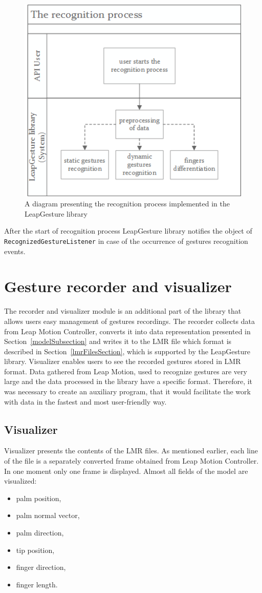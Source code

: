\begin{figure}[htb]
\centering
 \includegraphics[width=0.6\columnwidth]{figures/recognitionProcess.png}
 \caption{A diagram presenting the recognition process implemented in the LeapGesture library}
 \label{recognitionprocess}
\end{figure}

After the start of recognition process LeapGesture library notifies the object of \linebreak \texttt{RecognizedGestureListener} in case of the occurrence of gestures recognition events.

\section{Gesture recorder and visualizer}\label{recordvisualSection}
The recorder and visualizer module is an additional part of the library that allows users easy management of gestures recordings. The recorder collects data from Leap Motion Controller, converts it into data representation presented in Section~\ref{modelSubsection} and writes it to the LMR file which format is described in Section~\ref{lmrFilesSection}, which is supported by the LeapGesture library. Visualizer enables users to see the recorded gestures stored in LMR format. Data gathered from Leap Motion, used to recognize gestures are very large and the data processed in the library have a specific format. Therefore, it was necessary to create an auxiliary program, that it would facilitate the work with data in the fastest and most user-friendly way.

\subsection{Visualizer}
Visualizer presents the contents of the LMR files. As mentioned earlier, each line of the file is a separately converted frame obtained from Leap Motion Controller. In one moment only one frame is displayed.
Almost all fields of the model are visualized:
\begin{itemize}
\item palm position,
\item palm normal vector,
\item palm direction,
\item tip position,
\item finger direction,
\item finger length.
\end{itemize}

